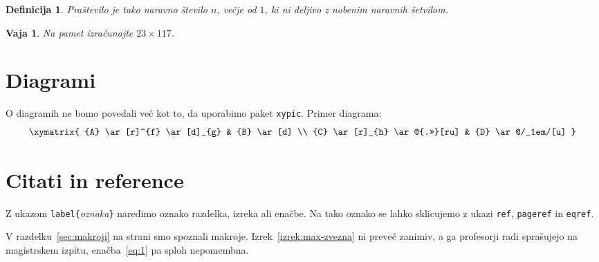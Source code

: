 \documentclass{amsart}
\newtheorem{definicija}[izrek]{Definicija}
\newtheorem{vaja}[izrek]{Vaja}
\begin{document}
\begin{definicija}
  \emph{Praštevilo} je tako naravno število $n$, večje od $1$, ki ni deljivo z nobenim
  naravnih šetvilom.
\end{definicija}

\begin{vaja}
  Na pamet izračunajte $23 \times 117$.
\end{vaja}

\section{Diagrami}
\label{sec:diagrami}

O diagramih ne bomo povedali več kot to, da uporabimo paket \texttt{xypic}. Primer diagrama:
%
\begin{equation*}
  \xymatrix{
    {A}
    \ar[r]^{f}
    \ar[d]_{g}
    &
    {B}
    \ar[d]
    \\
    {C}
    \ar[r]_{h}
    \ar@{.>>}[ru]
    &
    {D}
    \ar@/_1em/[u]
  }
\end{equation*}

\section{Citati in reference}
\label{sec:citati}

Z ukazom \verb|label{|\emph{oznaka}\verb|}| naredimo oznako razdelka, izreka ali enačbe. Na tako oznako se lahko sklicujemo z ukazi \verb|ref|, \verb|pageref| in \verb|eqref|.

V razdelku~\ref{sec:makroji} na strani \pageref{sec:makroji} smo spoznali makroje.
Izrek~\ref{izrek:max-zvezna} ni preveč zanimiv, a ga profesorji radi sprašujejo na
magistrskem izpitu, enačba~\eqref{eq:1} pa sploh nepomembna.
\end{document}
